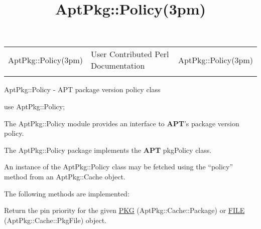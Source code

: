 \documentclass[]{article}
\title{AptPkg::Policy(3pm)}
\author{}
\date{}
\let\realtextbf=\textbf
\renewcommand{\textbf}[1]{\textcolor{boldcolor}{\realtextbf{#1}}}
\renewcommand{\emph}[1]{\underline{#1}}
\begin{document}
\maketitle

\begin{longtable}[c]{@{}lll@{}}
\toprule\addlinespace
AptPkg::Policy(3pm) & User Contributed Perl Documentation &
AptPkg::Policy(3pm)
\\\addlinespace
\bottomrule
\end{longtable}


AptPkg::Policy - APT package version policy class


use AptPkg::Policy;


The AptPkg::Policy module provides an interface to \textbf{APT}'s
package version policy.


The AptPkg::Policy package implements the \textbf{APT} pkgPolicy class.

An instance of the AptPkg::Policy class may be fetched using the
``policy'' method from an AptPkg::Cache object.

The following methods are implemented:

\begin{description}
\itemsep1pt\parskip0pt
\item[priority(\emph{PKG}\textbar{}\emph{FILE})]
Return the pin priority for the given \emph{PKG}
(AptPkg::Cache::Package) or \emph{FILE} (AptPkg::Cache::PkgFile) object.
\end{description}
\end{document}
